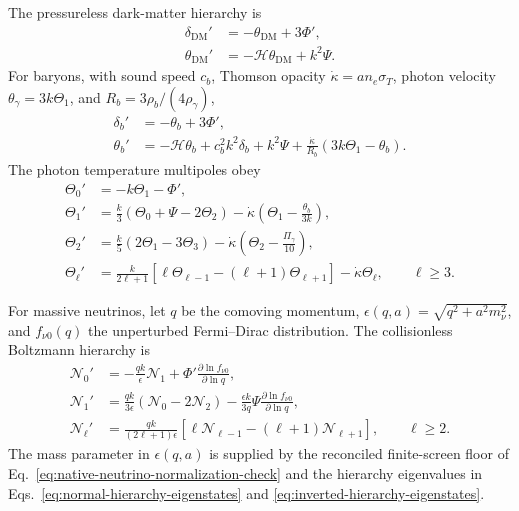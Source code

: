 \documentclass[11pt,letterpaper]{article}
\theoremstyle{plain}
\begin{document}
The pressureless dark-matter hierarchy is
\begin{align}
\label{eq:shbt-dark-matter-perturbations}
 \delta_{\text{DM}}'
 &=
 -\theta_{\text{DM}}+3\Phi',
 \\
 \theta_{\text{DM}}'
 &=
 -\mathcal H\theta_{\text{DM}}+k^2\Psi.
\end{align}
For baryons, with sound speed \(c_b\), Thomson opacity
\(\dot\kappa=a n_e\sigma_T\), photon velocity
\(\theta_\gamma=3k\Theta_1\), and
\(R_b=3\rho_b/(4\rho_\gamma)\),
\begin{align}
\label{eq:shbt-baryon-perturbations}
 \delta_b'
 &=
 -\theta_b+3\Phi',
 \\
 \theta_b'
 &=
 -\mathcal H\theta_b
 +c_b^2k^2\delta_b
 +k^2\Psi
 +\frac{\dot\kappa}{R_b}
 \left(3k\Theta_1-\theta_b\right).
\end{align}
The photon temperature multipoles obey
\begin{align}
\label{eq:shbt-photon-monopole}
 \Theta_0'
 &=
 -k\Theta_1-\Phi',
 \\
\label{eq:shbt-photon-dipole}
 \Theta_1'
 &=
 \frac{k}{3}
 \left(\Theta_0+\Psi-2\Theta_2\right)
 -\dot\kappa
 \left(
 \Theta_1-\frac{\theta_b}{3k}
 \right),
 \\
\label{eq:shbt-photon-quadrupole}
 \Theta_2'
 &=
 \frac{k}{5}
 \left(2\Theta_1-3\Theta_3\right)
 -\dot\kappa
 \left(
 \Theta_2-\frac{\Pi_\gamma}{10}
 \right),
 \\
\label{eq:shbt-photon-hierarchy}
 \Theta_\ell'
 &=
 \frac{k}{2\ell+1}
 \left[
 \ell\Theta_{\ell-1}
 -(\ell+1)\Theta_{\ell+1}
 \right]
 -\dot\kappa\Theta_\ell,
 \qquad
 \ell\ge3.
\end{align}

For massive neutrinos, let \(q\) be the comoving momentum,
\(\epsilon(q,a)=\sqrt{q^2+a^2m_\nu^2}\), and \(f_{\nu0}(q)\) the unperturbed
Fermi--Dirac distribution.  The collisionless Boltzmann hierarchy is
\begin{align}
\label{eq:shbt-neutrino-monopole}
 \mathcal N_0'
 &=
 -\frac{qk}{\epsilon}\mathcal N_1
 +\Phi'
 \frac{\partial\ln f_{\nu0}}{\partial\ln q},
 \\
\label{eq:shbt-neutrino-dipole}
 \mathcal N_1'
 &=
 \frac{qk}{3\epsilon}
 \left(\mathcal N_0-2\mathcal N_2\right)
 -\frac{\epsilon k}{3q}\Psi
 \frac{\partial\ln f_{\nu0}}{\partial\ln q},
 \\
\label{eq:shbt-neutrino-hierarchy}
 \mathcal N_\ell'
 &=
 \frac{qk}{(2\ell+1)\epsilon}
 \left[
 \ell\mathcal N_{\ell-1}
 -(\ell+1)\mathcal N_{\ell+1}
 \right],
 \qquad
 \ell\ge2.
\end{align}
The mass parameter in \(\epsilon(q,a)\) is supplied by the reconciled
finite-screen floor of Eq.~\eqref{eq:native-neutrino-normalization-check} and
the hierarchy eigenvalues in
Eqs.~\eqref{eq:normal-hierarchy-eigenstates} and
\eqref{eq:inverted-hierarchy-eigenstates}.
\end{document}
